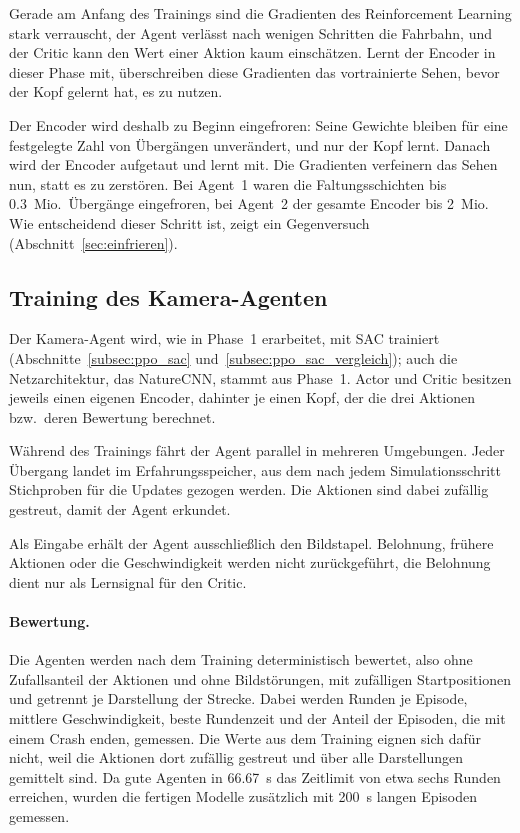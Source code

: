 Gerade am Anfang des Trainings sind die Gradienten des Reinforcement Learning stark verrauscht, der Agent verlässt nach wenigen Schritten die Fahrbahn, und der Critic kann den Wert einer Aktion kaum einschätzen. Lernt der Encoder in dieser Phase mit, überschreiben diese Gradienten das vortrainierte Sehen, bevor der Kopf gelernt hat, es zu nutzen.

Der Encoder wird deshalb zu Beginn eingefroren: Seine Gewichte bleiben für eine festgelegte Zahl von Übergängen unverändert, und nur der Kopf lernt. Danach wird der Encoder aufgetaut und lernt mit. Die Gradienten verfeinern das Sehen nun, statt es zu zerstören. Bei Agent~1 waren die Faltungsschichten bis \num{0.3}~Mio.\ Übergänge eingefroren, bei Agent~2 der gesamte Encoder bis 2~Mio. Wie entscheidend dieser Schritt ist, zeigt ein Gegenversuch (Abschnitt~\ref{sec:einfrieren}).

\subsection{Training des Kamera-Agenten}
\label{sec:kamera_training}

Der Kamera-Agent wird, wie in Phase~1 erarbeitet, mit \ac{SAC} trainiert (Abschnitte~\ref{subsec:ppo_sac} und~\ref{subsec:ppo_sac_vergleich}); auch die Netzarchitektur, das NatureCNN, stammt aus Phase~1. Actor und Critic besitzen jeweils einen eigenen Encoder, dahinter je einen Kopf, der die drei Aktionen bzw.\ deren Bewertung berechnet.

Während des Trainings fährt der Agent parallel in mehreren Umgebungen. Jeder Übergang landet im Erfahrungsspeicher, aus dem nach jedem Simulationsschritt Stichproben für die Updates gezogen werden. Die Aktionen sind dabei zufällig gestreut, damit der Agent erkundet.

Als Eingabe erhält der Agent ausschließlich den Bildstapel. Belohnung, frühere Aktionen oder die Geschwindigkeit werden nicht zurückgeführt, die Belohnung dient nur als Lernsignal für den Critic.

\paragraph{Bewertung.}
Die Agenten werden nach dem Training deterministisch bewertet, also ohne Zufallsanteil der Aktionen und ohne Bildstörungen, mit zufälligen Startpositionen und getrennt je Darstellung der Strecke. Dabei werden Runden je Episode, mittlere Geschwindigkeit, beste Rundenzeit und der Anteil der Episoden, die mit einem Crash enden, gemessen. Die Werte aus dem Training eignen sich dafür nicht, weil die Aktionen dort zufällig gestreut und über alle Darstellungen gemittelt sind. Da gute Agenten in \SI{66.67}{\second} das Zeitlimit von etwa sechs Runden erreichen, wurden die fertigen Modelle zusätzlich mit \SI{200}{\second} langen Episoden gemessen.

